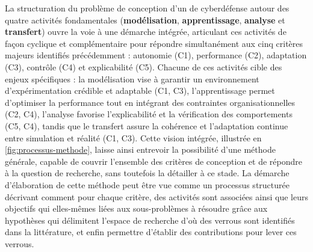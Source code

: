La structuration du problème de conception d'un  de cyberdéfense autour des quatre activités fondamentales (\textbf{modélisation}, \textbf{apprentissage}, \textbf{analyse} et \textbf{transfert}) ouvre la voie à une démarche intégrée, articulant ces activités de façon cyclique et complémentaire pour répondre simultanément aux cinq critères majeurs identifiés précédemment : autonomie (C1), performance (C2), adaptation (C3), contrôle (C4) et explicabilité (C5). Chacune de ces activités cible des enjeux spécifiques : la modélisation vise à garantir un environnement d'expérimentation crédible et adaptable (C1, C3), l'apprentissage permet d'optimiser la performance tout en intégrant des contraintes organisationnelles (C2, C4), l'analyse favorise l'explicabilité et la vérification des comportements (C5, C4), tandis que le transfert assure la cohérence et l'adaptation continue entre simulation et réalité (C1, C3).
%
Cette vision intégrée, illustrée en \autoref{fig:processus-methode}, laisse ainsi entrevoir la possibilité d'une méthode générale, capable de couvrir l'ensemble des critères de conception et de répondre à la question de recherche, sans toutefois la détailler à ce stade. La démarche d'élaboration de cette méthode peut être vue comme un processus structurée décrivant comment pour chaque critère, des activités sont associées ainsi que leurs objectifs qui elles-mêmes liées aux sous-problèmes à résoudre grâce aux hypothèses qui délimitent l'espace de recherche d'où des verrous sont identifiés dans la littérature, et enfin permettre d'établir des contributions pour lever ces verrous.

